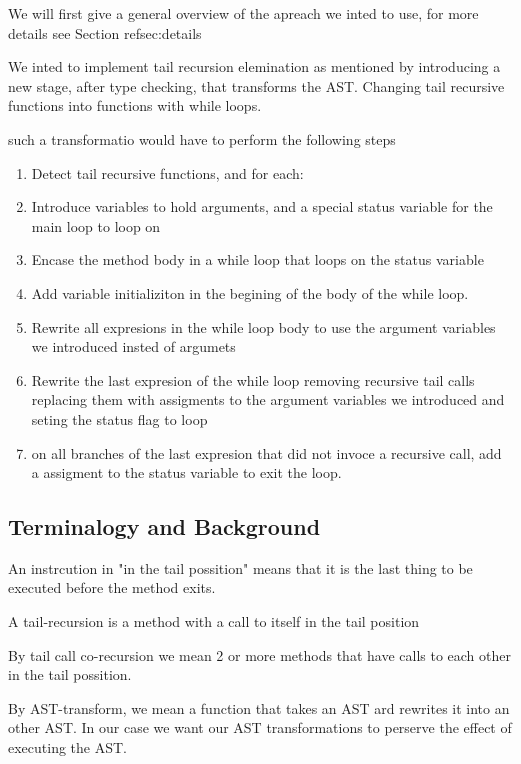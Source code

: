 We will first give a general overview of the apreach we inted to use, for more details see Section ref{sec:details}

We inted to implement tail recursion elemination as mentioned by introducing a new stage, after type checking, that transforms the AST. Changing tail recursive functions into functions with while loops.

such a transformatio would have to perform the following steps

\begin{enumerate}
    \item Detect tail recursive functions, and for each:
    \item Introduce variables to hold arguments, and a special status variable for the main loop to loop on
    \item Encase the method body in a while loop that loops on the status variable
    \item Add variable initializiton in the begining of the body of the while loop.
    \item Rewrite all expresions in the while loop body to use the argument variables we introduced insted of argumets 
    \item Rewrite the last expresion of the while loop removing recursive tail calls replacing them with assigments to the argument variables we introduced and seting the status flag to loop
    \item on all branches of the last expresion that did not invoce a recursive call, add a assigment to the status variable to exit the loop.
\end{enumerate}




\subsection{Terminalogy and Background}
An instrcution in "in the tail possition" means that it is the last thing to be executed before the method exits.

A tail-recursion is a method with a call to itself in the tail position

By tail call co-recursion we mean 2 or more methods that have calls to each other in the tail possition.


By AST-transform, we mean a function that takes an AST ard rewrites it into an other AST. In our case we want our AST transformations to perserve the effect of executing the AST.


